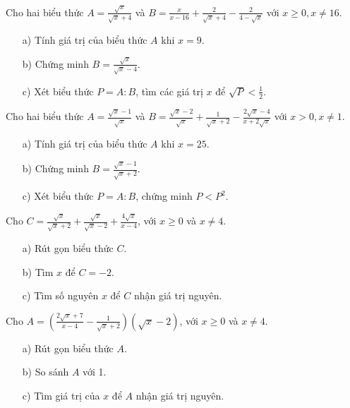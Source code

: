 \documentclass[%
    fontsize=12pt,%
    chapterprefix=false,%
    open=right,%
    twoside=false,%
    numbers=noenddot,%
    headings=optiontohead,%
    final,%
    DIV=15,%
    parskip=half %
]{scrbook}
\begin{document}
\begin{tuluan}
\item Cho hai biểu thức $ A = \frac{\sqrt{x}}{\sqrt{x} + 4} $ và $ B = \frac{x}{x - 16} + \frac{2}{\sqrt{x} + 4} - \frac{2}{4 - \sqrt{x}} $ với $ x \geq 0, x \neq 16 $.
\begin{enumerate}[label=\alph*)]
  \item[a)] Tính giá trị của biểu thức $ A $ khi $ x = 9 $.
  \item[b)] Chứng minh $ B = \frac{\sqrt{x}}{\sqrt{x} - 4} $.
  \item[c)] Xét biểu thức $ P = A : B $, tìm các giá trị $ x $ để $ \sqrt{P} < \frac{1}{2} $.
\end{enumerate}

\item Cho hai biểu thức $ A = \frac{\sqrt{x} - 1}{\sqrt{x}} $ và $ B = \frac{\sqrt{x} - 2}{\sqrt{x}} + \frac{1}{\sqrt{x} + 2} - \frac{2\sqrt{x} - 4}{x + 2\sqrt{x}} $ với $ x > 0, x \neq 1 $.
\begin{enumerate}[label=\alph*)]
  \item[a)] Tính giá trị của biểu thức $ A $ khi $ x = 25 $.
  \item[b)] Chứng minh $ B = \frac{\sqrt{x} - 1}{\sqrt{x} + 2} $.
  \item[c)] Xét biểu thức $ P = A : B $, chứng minh $ P < P^2 $.
\end{enumerate}

\item Cho $ C = \frac{\sqrt{x}}{\sqrt{x} + 2} + \frac{\sqrt{x}}{\sqrt{x} - 2} + \frac{4\sqrt{x}}{x - 4} $, với $ x \geq 0 $ và $ x \neq 4 $.
\begin{enumerate}[label=\alph*)]
  \item[a)] Rút gọn biểu thức $ C $.
  \item[b)] Tìm $ x $ để $ C = -2 $.
  \item[c)] Tìm số nguyên $ x $ để $ C $ nhận giá trị nguyên.
\end{enumerate}

\item Cho $ A = \left( \frac{2\sqrt{x} + 7}{x - 4} - \frac{1}{\sqrt{x} + 2} \right)(\sqrt{x} - 2) $, với $ x \geq 0 $ và $ x \neq 4 $.
\begin{enumerate}[label=\alph*)]
  \item[a)] Rút gọn biểu thức $ A $.
  \item[b)] So sánh $ A $ với 1.
  \item[c)] Tìm giá trị của $ x $ để $ A $ nhận giá trị nguyên.
\end{enumerate}


\end{tuluan}
\end{document}
